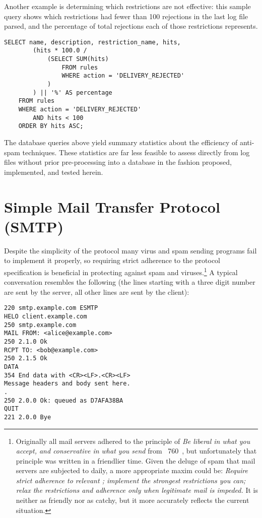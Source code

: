 Another example is determining which restrictions are not effective: this
sample query shows which restrictions had fewer than 100 rejections in the
last log file parsed, and the percentage of total rejections each of those
restrictions represents.

\begin{verbatim}
SELECT name, description, restriction_name, hits,
        (hits * 100.0 /
            (SELECT SUM(hits)
                FROM rules
                WHERE action = 'DELIVERY_REJECTED'
            )
        ) || '%' AS percentage
    FROM rules
    WHERE action = 'DELIVERY_REJECTED'
        AND hits < 100
    ORDER BY hits ASC;
\end{verbatim}

The database queries above yield summary statistics about the efficiency of
anti-spam techniques.  These statistics are far less feasible to assess
directly from log files without prior pre-processing into a database in the
fashion proposed, implemented, and tested herein.

\section{Simple Mail Transfer Protocol (SMTP)}

\label{SMTP background}

\SMTPglossaryDescription{} Despite the simplicity of the protocol many
virus and spam sending programs fail to implement it properly, so requiring
strict adherence to the protocol specification is beneficial in protecting
against spam and viruses.\footnote{\label{footnote:rfc760}Originally all
mail servers adhered to the principle of \textit{Be liberal in what you
accept, and conservative in what you send\/} from
~760~\cite{rfc760}, but unfortunately that principle was
written in a friendlier time.  Given the deluge of spam that mail servers
are subjected to daily, a more appropriate maxim could be: \textit{Require
strict adherence to relevant ; implement the strongest
restrictions you can; relax the restrictions and adherence only when
legitimate mail is impeded.\/}  It is neither as friendly nor as catchy,
but it more accurately reflects the current situation.} A typical
 conversation resembles the following (the lines starting
with a three digit number are sent by the server, all other lines are sent
by the client):

\begin{verbatim}
220 smtp.example.com ESMTP
HELO client.example.com
250 smtp.example.com
MAIL FROM: <alice@example.com>
250 2.1.0 Ok
RCPT TO: <bob@example.com>
250 2.1.5 Ok
DATA
354 End data with <CR><LF>.<CR><LF>
Message headers and body sent here.
.
250 2.0.0 Ok: queued as D7AFA38BA
QUIT
221 2.0.0 Bye
\end{verbatim}

